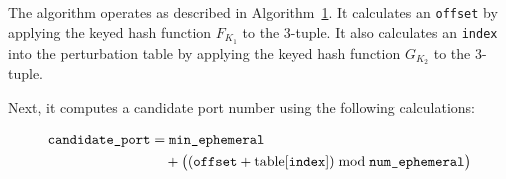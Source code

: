 \documentclass[twocolumn]{report}
\begin{document}
%
%
The algorithm operates as described in Algorithm~\hyperref[alg:dhps_port_selection]{1}. It calculates an \texttt{offset} by applying the keyed hash function \( F_{K_1} \) to the 3-tuple. It also calculates an \texttt{index} into the perturbation table by applying the keyed hash function \( G_{K_2} \) to the 3-tuple.

Next, it computes a \alert{candidate port number} using the following calculations:

\vspace{-0.4cm}
\begin{minipage}{\columnwidth}
	\begin{equation*}
		\begin{split}
			\texttt{candidate\_port}
			 & = \texttt{min\_ephemeral}      \\
			 & \quad + \bigl((\texttt{offset}
			+ \text{table[{\texttt{index}}]})
			\bmod \texttt{num\_ephemeral}\bigr)
		\end{split}
	\end{equation*}
\end{minipage}
\end{document}
